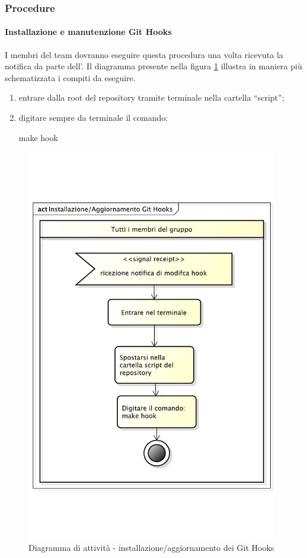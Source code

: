 		\subsubsection{Procedure}
			\paragraph{Installazione e manutenzione Git Hooks}
			\label{sec:installazione_git_hooks}
			I membri del team dovranno eseguire questa procedura una volta ricevuta la notifica da parte dell'\roleAdministrator. \newline
			Il diagramma presente nella figura \ref{fig:installazione_git_hook} illustra in maniera più schematizzata i compiti da eseguire.
				\begin{enumerate}
					\item entrare dalla root del repository tramite terminale nella cartella ``script'';
					\item digitare sempre da terminale il comando:
						\begin{center}
							make hook
						\end{center}
				\end{enumerate}

			\begin{figure}[htbp]
				\centering
				\includegraphics[width=11cm]{images/inst_git_hook.pdf}
				\caption{Diagramma di attività - installazione/aggiornamento dei Git Hooks}
				\label{fig:installazione_git_hook}
			\end{figure}

